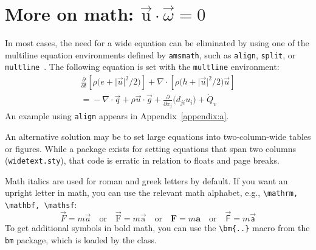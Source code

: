 \documentclass[varvw,largesc,upint,mathalfa=cal=euler,hyphenate,balance,lang-second=french,lang=english,colorlinks]{asmeconf} %
\begin{document}



\section[More on math: u\cdot\omega=0]{More on math: $\vec{\mathrm{u}}\cdot\vec{\omega}=0$}\label{sec:moremath}

In most cases, the need for a wide equation can be eliminated by using one of the multiline equation environments defined by 
\texttt{amsmath}, such as \texttt{align}, \texttt{split}, or \texttt{multline}~\cite{amsmath}. The following equation is set with the 
\texttt{multline} environment:
\begin{multline}\label{eqn:energy}
\frac{\partial}{\partial t}\left[\rho\bigl(e + \lvert\vec{u}\rvert^2\big/2\bigr)\right]  + \nabla\cdot\left[\rho\bigl(h + \lvert\vec{u}\rvert^2\big/2 \bigr)\vec{u}\right] \\
 ={}-\nabla \cdot \vec{q} +  \rho \vec{u}\cdot\vec{g}+ \frac{\partial}{\partial x_j}\bigl(d_{ji}u_i\bigr) + \dot{Q}_v
\end{multline}
An example using \texttt{align} appears in Appendix~\ref{appendix:a}.

An alternative solution may be to set large equations into two-column-wide tables or figures. While a package exists for setting equations that span two columns (\texttt{widetext.sty}), that code is erratic in relation to floats and page breaks.

Math italics are used for roman and greek letters by default.  If you want an upright letter in math, you can use the relevant math alphabet, e.g., \verb|\mathrm, \mathbf, \mathsf|:
\begin{equation}\label{eqn:dw}
\vec{F} = m \vec{a} \quad\textrm{or}\quad \vec{\mathrm{F}} = m \vec{\mathrm{a}} \quad\textrm{or}\quad \mathbf{F} = m \mathbf{a} \quad\textrm{or}\quad \vec{\mathsf{F}} = m \vec{\mathsf{a}}
\end{equation}
To get additional symbols in bold math, you can use the \verb|\bm{..}| macro from the \texttt{bm} package, which is loaded by the class.
\end{document}
